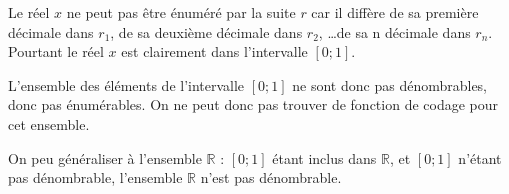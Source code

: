 \begin{enumerate}
Le réel $x$ ne peut pas être énuméré par la suite $r$ car il diffère de sa première décimale dans $r_1$, de sa deuxième décimale dans $r_2$, \ldots de sa n décimale dans $r_n$. Pourtant le réel $x$ est clairement dans l'intervalle $[0;1]$.

L'ensemble des éléments de l'intervalle $[0;1]$ ne sont donc pas dénombrables, donc pas énumérables. On ne peut donc pas trouver de fonction de codage pour cet ensemble.

On peu généraliser à l'ensemble $\mathbb{R}$ : $[0;1]$ étant inclus dans $\mathbb{R}$, et $[0;1]$ n'étant pas dénombrable, l'ensemble $\mathbb{R}$ n'est pas dénombrable.

\end{enumerate}
